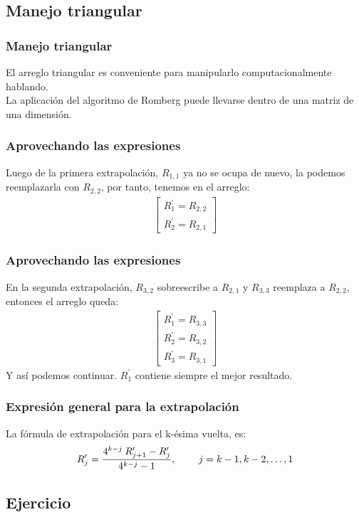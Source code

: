 \documentclass[12pt]{beamer}
\begin{document}
\subsection{Manejo triangular}

\begin{frame}
\frametitle{Manejo triangular}
El arreglo triangular es conveniente para manipularlo computacionalmente hablando.
\\
\bigskip
\pause
La aplicación del algoritmo de Romberg puede llevarse dentro de una matriz de una dimensión.
\end{frame}
\begin{frame}
\frametitle{Aprovechando las expresiones}
Luego de la primera extrapolación, $R_{1,1}$ ya no se ocupa de nuevo, \pause la podemos reemplazarla con $R_{2,2}$, por tanto, tenemos en el arreglo:
\pause
\begin{align*}
\begin{bmatrix}
R^{\prime}_{1} = R_{2, 2} \\
R^{\prime}_{2} = R_{2, 1}
\end{bmatrix}
\end{align*}
\end{frame}
\begin{frame}
\frametitle{Aprovechando las expresiones}
En la segunda extrapolación, $R_{3, 2} $ sobreescribe a $R_{2, 1}$ \pause y $R_{3, 3}$ reemplaza a $R_{2, 2}$, entonces el arreglo queda:
\pause
\begin{align*}
\begin{bmatrix}
R^{\prime}_{1} = R_{3, 3} \\
R^{\prime}_{2} = R_{3, 2} \\
R^{\prime}_{3} = R_{3, 1}
\end{bmatrix}
\end{align*} 
\pause
Y así podemos continuar. \pause $R^{\prime}_{1}$ contiene siempre el mejor resultado.
\end{frame}
\begin{frame}
\frametitle{Expresión general para la extrapolación}
La fórmula de extrapolación para el k-ésima vuelta, es:
\pause
\begin{align*}
R^{\prime}_{j} = \dfrac{4^{k - j} \: R^{\prime}_{j + 1} - R^{\prime}_{j}}{4^{k - j} - 1}, \hspace{0.8cm} j = k - 1, k - 2, \ldots, 1
\end{align*}
\end{frame}

\subsection{Ejercicio}
\end{document}
